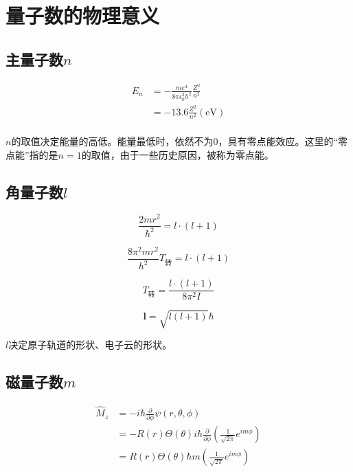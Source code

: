 
\section{量子数的物理意义}

\subsection{主量子数$n$}

\begin{align*}
    E_n &= - \frac{me^4}{8 \pi \epsilon_0^2 h^2} \frac{Z^2}{n^2} \\ 
    &= - 13.6 \frac{Z^2}{n^2} (\mathrm{eV})\\
\end{align*}

$n$的取值决定能量的高低。能量最低时，依然不为0，具有零点能效应。这里的``零点能''指的是$n = 1$的取值，由于一些历史原因，被称为零点能。

\subsection{角量子数$l$}

\begin{equation*}
    \frac{2m r^2}{\hbar ^2} = l \cdot (l + 1)
\end{equation*}

\begin{equation*}
    \frac{8 \pi^2 m r ^2}{h^2} T_{\mbox{转}} = l \cdot (l + 1)
\end{equation*}

\begin{equation*}
    T_{\mbox{转}} = \frac{l \cdot (l + 1)}{8 \pi^2 I}
\end{equation*}

\begin{equation*}
    \mathbf{l} = \sqrt{l(l + 1)}\hbar
\end{equation*}


$l$决定原子轨道的形状、电子云的形状。

\subsection{磁量子数$m$}

\begin{align*}
    \hat{M}_z &= -i\hbar \frac{\partial}{\partial \phi} \psi(r, \theta, \phi) \\ 
    &= - R(r) \Theta(\theta) i \hbar \frac{\partial}{\partial \phi} \left( \frac{1}{\sqrt{2\pi}} e^{im\phi} \right) \\
    &= R(r) \Theta(\theta) \hbar m \left( \frac{1}{\sqrt{2\pi}} e^{im\phi} \right)
\end{align*}

